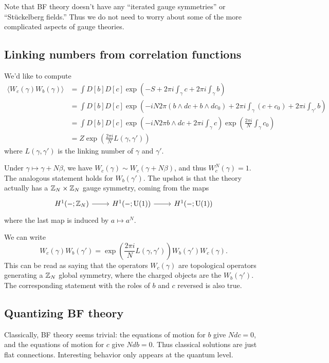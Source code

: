 Note that BF theory doesn't have any ``iterated gauge symmetries'' or ``St\"uckelberg fields.''
Thus we do not need to worry about some of the more complicated aspects of gauge theories.

\subsection{Linking numbers from correlation functions}

We'd like to compute
\begin{align*}
	\langle W_c(\gamma) W_b(\gamma) \rangle &= \int D[b] D[c] \exp\left(-S + 2\pi i \int_\gamma c + 2\pi i \int_\gamma b\right) \\
						&= \int D[b] D[c] \exp\left(-i N 2\pi (b \wedge dc + b \wedge dc_0) + 2\pi i \int_\gamma (c + c_0) + 2\pi i \int_{\gamma'} b\right) \\
						&= \int D[b] D[c] \exp\left(-i N 2\pi b \wedge dc + 2\pi i \int_\gamma c\right) \exp\left( \frac{2\pi i}{N} \int_\gamma c_0 \right) \\
						&= Z \exp\left(\frac{2\pi i}{N} L(\gamma, \gamma')\right)
\end{align*}
where $L(\gamma, \gamma')$ is the linking number of $\gamma$ and $\gamma'$.

Under $\gamma \mapsto \gamma + N \beta$, we have $W_c(\gamma) \sim W_c(\gamma + N \beta)$, and thus $W_c^N(\gamma) = 1$.
The analogous statement holds for $W_b(\gamma')$.
The upshot is that the theory actually has a $\mathbb{Z}_N \times \mathbb{Z}_N$ gauge symmetry, coming from the maps
\[
	\begin{tikzcd}
		H^1(-; \ZZ_N) \rar & H^1(-; \U(1)) \rar & H^1(-; \U(1))
	\end{tikzcd}
\]
where the last map is induced by $a \mapsto a^N$.

We can write
\[
	W_c(\gamma) W_b(\gamma') = \exp\left(\frac{2\pi i}{N} L(\gamma, \gamma')\right) W_b(\gamma') W_c(\gamma).
\]
This can be read as saying that the operators $W_c(\gamma)$ are topological operators generating a $\mathbb{Z}_N$ global symmetry, where the charged objects are the $W_b(\gamma')$.
The corresponding statement with the roles of $b$ and $c$ reversed is also true.

\subsection{Quantizing BF theory}

Classically, BF theory seems trivial: the equations of motion for $b$ give $N dc = 0$, and the equations of motion for $c$ give $N db = 0$.
Thus classical solutions are just flat connections.
Interesting behavior only appears at the quantum level.

